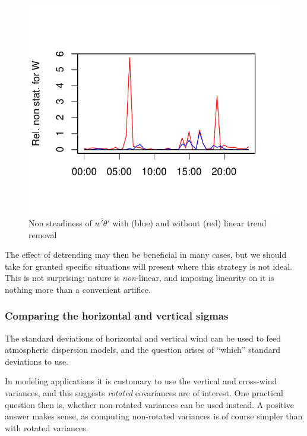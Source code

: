\documentclass[a4paper,10pt]{book}
\begin{document}
\begin{figure}[htp]
 \centering
 \begin{center}
 \includegraphics[scale=1.1,keepaspectratio=true]{./diagrams/WTNstDetrend.pdf}
 \end{center}
 \caption{Non steadiness of $\overline{w'\theta'}$ with (blue) and without (red) linear trend removal}
 \label{fig:Nst detrend}
\end{figure}

The effect of detrending may then be beneficial in many cases, but we should take for granted specific situations will present where this strategy is not ideal. This is not surprising: nature is \emph{non}-linear, and imposing linearity on it is nothing more than a convenient artifice.

\subsubsection{Comparing the horizontal and vertical sigmas}

The standard deviations of horizontal and vertical wind can be used to feed atmospheric dispersion models, and the question arises of ``which'' standard deviations to use.

In modeling applications it is customary to use the vertical and cross-wind variances, and this suggests \emph{rotated} covariances are of interest. One practical question then is, whether non-rotated variances can be used instead. A positive answer makes sense, as computing non-rotated variances is of course simpler than with rotated variances.
\end{document}
